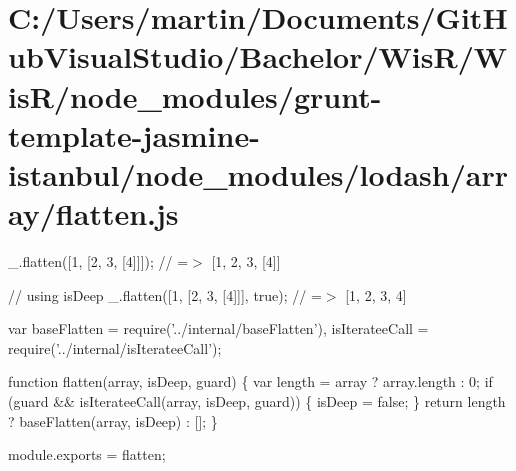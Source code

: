 \hypertarget{_c_1_2_users_2martin_2_documents_2_git_hub_visual_studio_2_bachelor_2_wis_r_2_wis_r_2node_module45dfce6b9c0f9c01e23f33e5addc8842}{}\section{C\+:/\+Users/martin/\+Documents/\+Git\+Hub\+Visual\+Studio/\+Bachelor/\+Wis\+R/\+Wis\+R/node\+\_\+modules/grunt-\/template-\/jasmine-\/istanbul/node\+\_\+modules/lodash/array/flatten.\+js}
\+\_\+.\+flatten(\mbox{[}1, \mbox{[}2, 3, \mbox{[}4\mbox{]}\mbox{]}\mbox{]}); // =$>$ \mbox{[}1, 2, 3, \mbox{[}4\mbox{]}\mbox{]}

// using {\ttfamily is\+Deep} \+\_\+.\+flatten(\mbox{[}1, \mbox{[}2, 3, \mbox{[}4\mbox{]}\mbox{]}\mbox{]}, true); // =$>$ \mbox{[}1, 2, 3, 4\mbox{]}


\begin{DoxyCodeInclude}
var baseFlatten = require(\textcolor{stringliteral}{'../internal/baseFlatten'}),
    isIterateeCall = require(\textcolor{stringliteral}{'../internal/isIterateeCall'});

\textcolor{keyword}{function} flatten(array, isDeep, guard) \{
  var length = array ? array.length : 0;
  \textcolor{keywordflow}{if} (guard && isIterateeCall(array, isDeep, guard)) \{
    isDeep = \textcolor{keyword}{false};
  \}
  \textcolor{keywordflow}{return} length ? baseFlatten(array, isDeep) : [];
\}

module.exports = flatten;
\end{DoxyCodeInclude}
 